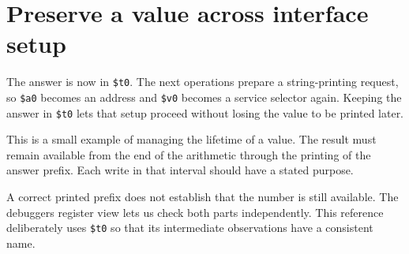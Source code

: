 \section{Preserve a value across interface
  setup}\label{001-console-calculation-p11-preserve-a-value-across-interface-setup}

The answer is now in \texttt{\$t0}. The next operations prepare a
string-printing request, so \texttt{\$a0} becomes an address and
\texttt{\$v0} becomes a service selector again. Keeping the answer in
\texttt{\$t0} lets that setup proceed without losing the value to be
printed later.

This is a small example of managing the lifetime of a value. The result
must remain available from the end of the arithmetic through the
printing of the answer prefix. Each write in that interval should have a
stated purpose.

A correct printed prefix does not establish that the number is still
available. The debugger\textquotesingle s register view lets us check
both parts independently. This reference deliberately uses \texttt{\$t0}
so that its intermediate observations have a consistent name.
